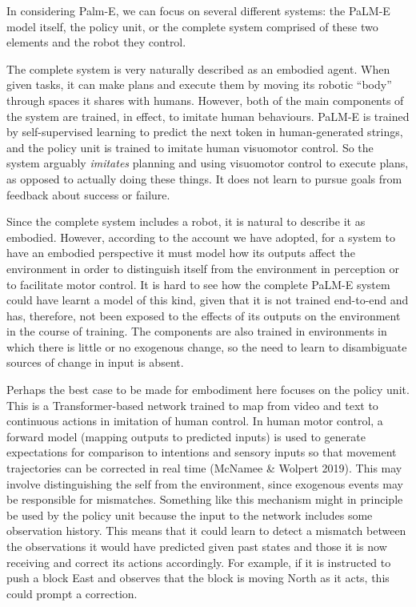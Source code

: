 \documentclass[12pt]{article}
\begin{document}
In considering Palm-E, we can focus on several different systems: the PaLM-E model itself, the policy unit, or the complete system comprised of these two elements and the robot they control.

The complete system is very naturally described as an embodied agent. When given tasks, it can make plans and execute them by moving its robotic ``body'' through spaces it shares with humans. However, both of the main components of the system are trained, in effect, to imitate human behaviours. PaLM-E is trained by self-supervised learning to predict the next token in human-generated strings, and the policy unit is trained to imitate human visuomotor control. So the system arguably \textit{imitates} planning and using visuomotor control to execute plans, as opposed to actually doing these things. It does not learn to pursue goals from feedback about success or failure.

Since the complete system includes a robot, it is natural to describe it as embodied. However, according to the account we have adopted, for a system to have an embodied perspective it must model how its outputs affect the environment in order to distinguish itself from the environment in perception or to facilitate motor control. It is hard to see how the complete PaLM-E system could have learnt a model of this kind, given that it is not trained end-to-end and has, therefore, not been exposed to the effects of its outputs on the environment in the course of training. The components are also trained in environments in which there is little or no exogenous change, so the need to learn to disambiguate sources of change in input is absent.

Perhaps the best case to be made for embodiment here focuses on the policy unit. This is a Transformer-based network trained to map from video and text to continuous actions in imitation of human control. In human motor control, a forward model (mapping outputs to predicted inputs) is used to generate expectations for comparison to intentions and sensory inputs so that movement trajectories can be corrected in real time (McNamee \& Wolpert 2019). This may involve distinguishing the self from the environment, since exogenous events may be responsible for mismatches. Something like this mechanism might in principle be used by the policy unit because the input to the network includes some observation history. This means that it could learn to detect a mismatch between the observations it would have predicted given past states and those it is now receiving and correct its actions accordingly. For example, if it is instructed to push a block East and observes that the block is moving North as it acts, this could prompt a correction.
\end{document}
